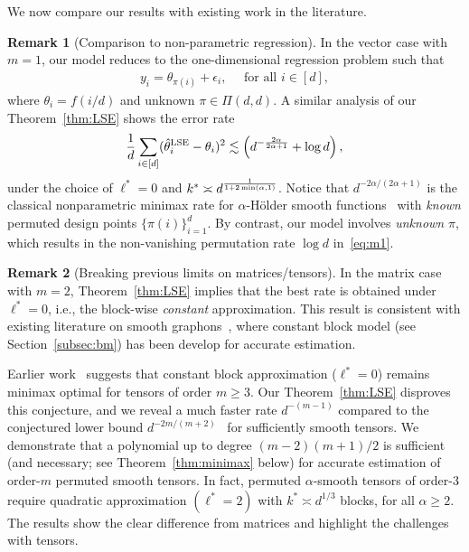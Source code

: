 \documentclass[11pt]{article}
\theoremstyle{definition}
\newtheorem{rmk}{Remark}
\begin{document}
We now compare our results with existing work in the literature.
\begin{rmk}[Comparison to non-parametric regression]
In the vector case with $m = 1$,  our model reduces to the one-dimensional regression problem such that
\begin{align}
    y_i  = \theta_{\pi(i)}+\epsilon_i,  \quad\text{ for all } i\in [d],
\end{align}
where $\theta_i=f(i/d)$ and unknown $\pi \in \Pi(d,d)$.
A similar analysis of our Theorem~\ref{thm:LSE} shows the error rate
\begin{align}\label{eq:m1}
    \frac{1}{d}\sum_{i\in[d]}(\hat\theta_i^{\text{LSE}}-\theta_i)^2 \lesssim \left(d^{-{2\alpha\over 2\alpha+1}}+\log d\right),
\end{align}
under the choice of $\ell^* = 0$ and $k^* \asymp d^{1\over 1+2\min(\alpha,1)}$.
Notice that  $d^{-2\alpha/(2\alpha+1)}$ is the  classical nonparametric minimax rate for $\alpha$-Hölder smooth functions~\citep{tsybakov2009introduction} with \emph{known} permuted design points $\{\pi(i)\}_{i=1}^d$. By contrast, our model involves \emph{unknown} $\pi$, which results in the non-vanishing permutation rate $\log d$ in~\eqref{eq:m1}.
\end{rmk}

\begin{rmk}[Breaking previous limits on matrices/tensors]
In the matrix case with $m=2$, Theorem~\ref{thm:LSE} implies that the best rate is obtained under $\ell^*=0$, i.e., the block-wise \emph{constant} approximation. This result is consistent with existing literature on smooth graphons~\citep{bickel2009nonparametric,gao2015rate,klopp2017oracle}, where constant block model (see Section~\ref{subsec:bm}) has been develop for accurate estimation.

Earlier work~\citep{balasubramanian2021nonparametric} suggests that constant block approximation ($\ell^*=0$) remains minimax optimal for tensors of order $m\geq 3$. Our Theorem~\ref{thm:LSE} disproves this conjecture, and we reveal a much faster rate $d^{-(m-1)}$ compared to the conjectured lower bound $d^{-2m/( m+2)}$~\citep{balasubramanian2021nonparametric} for sufficiently smooth tensors. We demonstrate that a polynomial up to degree $(m-2)(m+1)/2$ is sufficient (and necessary; see Theorem~\ref{thm:minimax} below) for accurate estimation of order-$m$ permuted smooth tensors. 
In fact, permuted $\alpha$-smooth tensors of order-3 require quadratic approximation $(\ell^*=2)$ with $k^*\asymp d^{1/3}$ blocks, for all $\alpha\geq 2$. The results show the clear difference from matrices and highlight the challenges with tensors.
\end{rmk}
\end{document}
